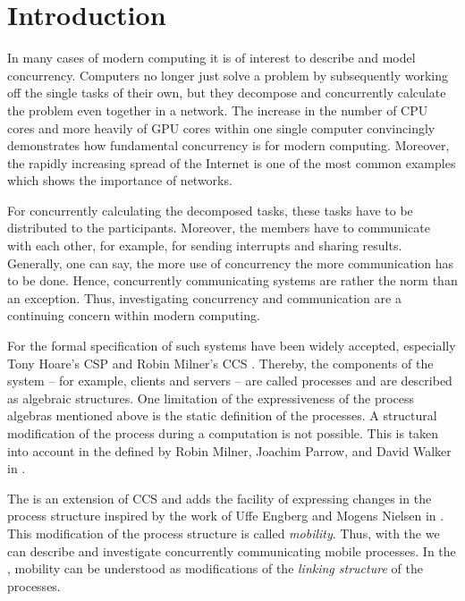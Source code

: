 \chapter{Introduction}
\pagestyle{scrheadings}	
\setcounter{page}{0}
\label{sec_introduction}
In many cases of modern computing it is of interest to describe and model concurrency. Computers no longer just solve a problem by subsequently working off the single tasks of their own, but they decompose and concurrently calculate the problem even together in a network. The increase in the number of CPU cores and more heavily of GPU cores within one single computer convincingly demonstrates how fundamental concurrency is for modern computing. Moreover, the rapidly increasing spread of the Internet is one of the most common examples which shows the importance of networks.

For concurrently calculating the decomposed tasks, these tasks have to be distributed to the participants. Moreover, the members have to communicate with each other, for example, for sending interrupts and sharing results. Generally, one can say, the more use of concurrency the more communication has to be done. Hence, concurrently communicating systems are rather the norm than an exception. Thus, investigating concurrency and communication are a continuing concern within modern computing.

For the formal specification of such systems  have been widely accepted, especially Tony Hoare's \gls{CSP} \cite{hoareOriginalCSP} and Robin Milner's \gls{CCS} \cite{milnerCCS}. Thereby, the components of the system -- for example, clients and servers -- are called processes and are described as algebraic structures. One limitation of the expressiveness of the process algebras mentioned above is the static definition of the processes. A structural modification of the process during a computation is not possible. This is taken into account in the \picalc{} defined by Robin Milner, Joachim Parrow, and David Walker in \cite{milnerParrowWalker}.

The \picalc{} is an extension of \gls{CCS} and adds the facility of expressing changes in the process structure inspired by the work of Uffe Engberg and Mogens Nielsen in \cite{engbertNielsen}. This modification of the process structure is called \emph{mobility}. Thus, with the \picalc{} we can describe and investigate concurrently communicating mobile processes. In the \picalc{}, mobility can be understood as modifications of the \emph{linking structure} of the processes.

